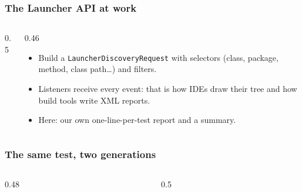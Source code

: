\documentclass[aspectratio=169,10pt,compress]{beamer}
\begin{document}
\begin{frame}[t,fragile] \frametitle{The Launcher API at work}
  \begin{columns}[T]
    \begin{column}{0.5\textwidth}
    \end{column}
    \begin{column}{0.46\textwidth}
      \begin{itemize}\small
        \item Build a \texttt{LauncherDiscoveryRequest} with selectors (class, package, method, class path\dots) and filters.
        \item Listeners receive every event: that is how IDEs draw their tree and how build tools write XML reports.
        \item Here: our own one-line-per-test report and a summary.
      \end{itemize}
    \end{column}
  \end{columns}
\end{frame}





\begin{frame}[t,fragile] \frametitle{The same test, two generations}
  \begin{columns}[T]
    \begin{column}{0.48\textwidth}
    \end{column}
    \begin{column}{0.5\textwidth}
    \end{column}
  \end{columns}
\end{frame}
\end{document}
